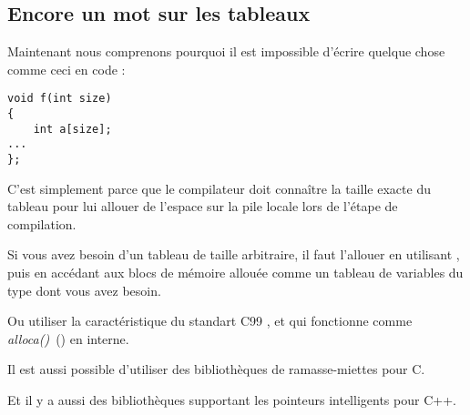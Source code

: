 \subsection{Encore un mot sur les tableaux}


Maintenant nous comprenons pourquoi il est impossible d'écrire quelque chose comme
ceci en code \CCpp:

\begin{lstlisting}[style=customc]
void f(int size)
{
    int a[size];
...
};
\end{lstlisting}


C'est simplement parce que le compilateur doit connaître la taille exacte du tableau
pour lui allouer de l'espace sur la pile locale lors de l'étape de compilation.


Si vous avez besoin d'un tableau de taille arbitraire, il faut l'allouer en utilisant
, puis en accédant aux blocs de mémoire allouée comme un tableau de
variables du type dont vous avez besoin.


Ou utiliser la caractéristique du standart C99 ,
et qui fonctionne comme \emph{alloca()}~() en interne.


Il est aussi possible d'utiliser des bibliothèques de ramasse-miettes pour C.

Et il y a aussi des bibliothèques supportant les pointeurs intelligents pour C++.

